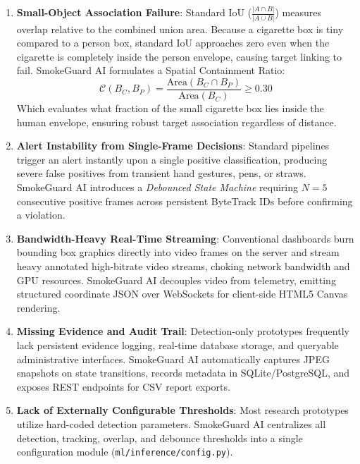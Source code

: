 \documentclass[11pt,a4paper]{article}
\begin{document}
\begin{enumerate}[leftmargin=*]
    \item \textbf{Small-Object Association Failure}: Standard IoU ($\frac{|A \cap B|}{|A \cup B|}$) measures overlap relative to the combined union area. Because a cigarette box is tiny compared to a person box, standard IoU approaches zero even when the cigarette is completely inside the person envelope, causing target linking to fail. SmokeGuard AI formulates a Spatial Containment Ratio:
    \begin{equation}
    \mathcal{C}(B_C, B_P) = \frac{\text{Area}(B_C \cap B_P)}{\text{Area}(B_C)} \ge 0.30
    \end{equation}
    Which evaluates what fraction of the small cigarette box lies inside the human envelope, ensuring robust target association regardless of distance.
    
    \item \textbf{Alert Instability from Single-Frame Decisions}: Standard pipelines trigger an alert instantly upon a single positive classification, producing severe false positives from transient hand gestures, pens, or straws. SmokeGuard AI introduces a \textit{Debounced State Machine} requiring $N=5$ consecutive positive frames across persistent ByteTrack IDs before confirming a violation.

    \item \textbf{Bandwidth-Heavy Real-Time Streaming}: Conventional dashboards burn bounding box graphics directly into video frames on the server and stream heavy annotated high-bitrate video streams, choking network bandwidth and GPU resources. SmokeGuard AI decouples video from telemetry, emitting structured coordinate JSON over WebSockets for client-side HTML5 Canvas rendering.

    \item \textbf{Missing Evidence and Audit Trail}: Detection-only prototypes frequently lack persistent evidence logging, real-time database storage, and queryable administrative interfaces. SmokeGuard AI automatically captures JPEG snapshots on state transitions, records metadata in SQLite/PostgreSQL, and exposes REST endpoints for CSV report exports.

    \item \textbf{Lack of Externally Configurable Thresholds}: Most research prototypes utilize hard-coded detection parameters. SmokeGuard AI centralizes all detection, tracking, overlap, and debounce thresholds into a single configuration module (\texttt{ml/inference/config.py}).
\end{enumerate}
\end{document}

